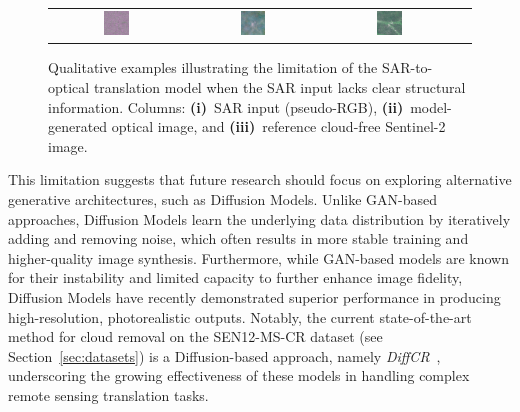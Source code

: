\begin{figure}[h!]
\begin{tabular}{c *{3}{c}}
        \includegraphics[width=0.2\textwidth, height=0.2\textheight, keepaspectratio]{img/limitation_noise/sample_000834_sar_pseudo.png} &
        \includegraphics[width=0.2\textwidth, height=0.2\textheight, keepaspectratio]{img/limitation_noise/sample_000834_pred_rgb.png} &
        \includegraphics[width=0.2\textwidth, height=0.2\textheight, keepaspectratio]{img/limitation_noise/sample_000834_true_rgb.png} \\
    \end{tabular}

    \caption[Model limitation on structureless SAR inputs]{%
    Qualitative examples illustrating the limitation of the SAR-to-optical translation model when the SAR input lacks clear structural information. 
    Columns: 
    \textbf{(i)}~SAR input (pseudo-RGB), 
    \textbf{(ii)}~model-generated optical image, and 
    \textbf{(iii)}~reference cloud-free Sentinel-2 image. 
    }
    \label{fig:limitation_noise}
\end{figure}

This limitation suggests that future research should focus on exploring alternative generative architectures, such as Diffusion Models. Unlike GAN-based approaches, Diffusion Models learn the underlying data distribution by iteratively adding and removing noise, which often results in more stable training and higher-quality image synthesis. Furthermore, while GAN-based models are known for their instability and limited capacity to further enhance image fidelity, Diffusion Models have recently demonstrated superior performance in producing high-resolution, photorealistic outputs. Notably, the current state-of-the-art method for cloud removal on the SEN12-MS-CR dataset (see Section~\ref{sec:datasets}) is a Diffusion-based approach, namely \textit{DiffCR}~\cite{DiffCR}, underscoring the growing effectiveness of these models in handling complex remote sensing translation tasks.

